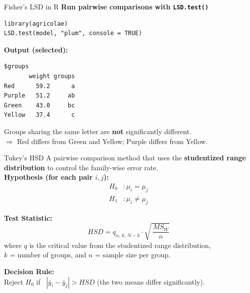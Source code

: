 \documentclass[aspectratio=169]{beamer}
\begin{document}
\begin{frame}[fragile]{Fisher's LSD in R}
\textbf{Run pairwise comparisons with \texttt{LSD.test()}}
\begin{lstlisting}
library(agricolae)
LSD.test(model, "plum", console = TRUE)
\end{lstlisting}

\vspace{4pt}
\textbf{Output (selected):}
\begin{lstlisting}[numbers=none, backgroundcolor=\color{yellow!8}]
$groups
       weight groups
Red      59.2      a
Purple   51.2     ab
Green    43.0     bc
Yellow   37.4      c
\end{lstlisting}

\vspace{4pt}
Groups sharing the same letter are \textbf{not} significantly different. \\
$\Rightarrow$ Red differs from Green and Yellow; Purple differs from Yellow.
\end{frame}


\begin{frame}{Tukey's HSD}
A pairwise comparison method that uses the \textbf{studentized range distribution} to control the family-wise error rate. \\
\vspace{5pt}
\textbf{Hypothesis (for each pair $i, j$):}
\[
\begin{aligned}
H_0 &: \mu_i = \mu_j \\
H_1 &: \mu_i \neq \mu_j
\end{aligned}
\]
\vspace{2pt}

\textbf{Test Statistic:}
\[
HSD = q_{\alpha,\, k,\, N-k} \cdot \sqrt{\,\frac{MS_W}{n}}
\]
where $q$ is the critical value from the studentized range distribution,\\
$k$ = number of groups, and $n$ = sample size per group.\\
\vspace{6pt}

\textbf{Decision Rule:}\\
Reject $H_0$ if \ $|\bar{y}_i - \bar{y}_j| > HSD$ \quad (the two means differ significantly).
\end{frame}
\end{document}
